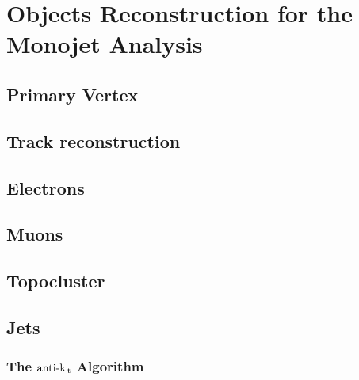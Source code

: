 \documentclass[10pt,twoside,cucitura,classica,english,openany]{toptesi}
\begin{document}
\chapter{Objects Reconstruction for the Monojet Analysis}
\label{cha:phys-objects-reconst}



\section{Primary Vertex}
\label{sec:primary-vertex}



\section{Track reconstruction}
\label{sec:track-reconstruction}



\section{Electrons}
\label{sec:electrons}



\section{Muons}
\label{sec:muons}



\section{Topocluster}
\label{sec:topocluster}



\section{Jets}
\label{sec:jets}



\subsection{The \emph{$\text{anti-k}_\mathrm{\, t}$} Algorithm}
\label{sec:anti-k_t}


\end{document}
